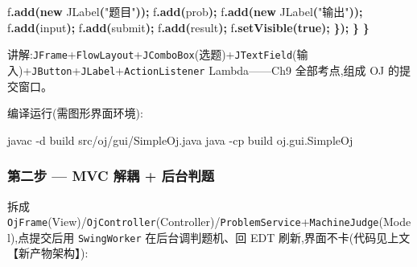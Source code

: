 \documentclass[
  11pt,
]{ctexart}
\newenvironment{Shaded}{\begin{snugshade}}{\end{snugshade}}
\newcommand{\AttributeTok}[1]{\textcolor[rgb]{0.13,0.29,0.53}{#1}}
\newcommand{\BuiltInTok}[1]{#1}
\newcommand{\ExtensionTok}[1]{#1}
\newcommand{\FunctionTok}[1]{\textcolor[rgb]{0.13,0.29,0.53}{\textbf{#1}}}
\newcommand{\KeywordTok}[1]{\textcolor[rgb]{0.13,0.29,0.53}{\textbf{#1}}}
\newcommand{\NormalTok}[1]{#1}
\newcommand{\OperatorTok}[1]{\textcolor[rgb]{0.81,0.36,0.00}{\textbf{#1}}}
\newcommand{\StringTok}[1]{\textcolor[rgb]{0.31,0.60,0.02}{#1}}
\newcommand{\VariableTok}[1]{\textcolor[rgb]{0.00,0.00,0.00}{#1}}
\begin{document}
\begin{Shaded}
\begin{Highlighting}[]
\NormalTok{            f}\OperatorTok{.}\FunctionTok{add}\OperatorTok{(}\KeywordTok{new} \BuiltInTok{JLabel}\OperatorTok{(}\StringTok{"题目"}\OperatorTok{));}\NormalTok{ f}\OperatorTok{.}\FunctionTok{add}\OperatorTok{(}\NormalTok{prob}\OperatorTok{);}
\NormalTok{            f}\OperatorTok{.}\FunctionTok{add}\OperatorTok{(}\KeywordTok{new} \BuiltInTok{JLabel}\OperatorTok{(}\StringTok{"输出"}\OperatorTok{));}\NormalTok{ f}\OperatorTok{.}\FunctionTok{add}\OperatorTok{(}\NormalTok{input}\OperatorTok{);}
\NormalTok{            f}\OperatorTok{.}\FunctionTok{add}\OperatorTok{(}\NormalTok{submit}\OperatorTok{);}\NormalTok{ f}\OperatorTok{.}\FunctionTok{add}\OperatorTok{(}\NormalTok{result}\OperatorTok{);}
\NormalTok{            f}\OperatorTok{.}\FunctionTok{setVisible}\OperatorTok{(}\KeywordTok{true}\OperatorTok{);}
        \OperatorTok{\});}
    \OperatorTok{\}}
\OperatorTok{\}}
\end{Highlighting}
\end{Shaded}

讲解:\texttt{JFrame}+\texttt{FlowLayout}+\texttt{JComboBox}(选题)+\texttt{JTextField}(输入)+\texttt{JButton}+\texttt{JLabel}+\texttt{ActionListener}
Lambda------Ch9 全部考点,组成 OJ 的提交窗口。

编译运行(需图形界面环境):

\begin{Shaded}
\begin{Highlighting}[]
\ExtensionTok{javac} \AttributeTok{{-}d}\NormalTok{ build src/oj/gui/SimpleOj.java}
\ExtensionTok{java} \AttributeTok{{-}cp}\NormalTok{ build oj.gui.SimpleOj}
\end{Highlighting}
\end{Shaded}

\hypertarget{ux7b2cux4e8cux6b65-mvc-ux89e3ux8026-ux540eux53f0ux5224ux9898}{%
\subsubsection{\texorpdfstring{第二步 \GC --- MVC 解耦 +
后台判题}{第二步 --- MVC 解耦 + 后台判题}}\label{ux7b2cux4e8cux6b65-mvc-ux89e3ux8026-ux540eux53f0ux5224ux9898}}

拆成
\texttt{OjFrame}(View)/\texttt{OjController}(Controller)/\texttt{ProblemService}+\texttt{MachineJudge}(Model),点提交后用
\texttt{SwingWorker} 在后台调判题机、回 EDT
刷新,界面不卡(代码见上文【新产物架构】):

\begin{Shaded}
\end{Shaded}
\end{document}
